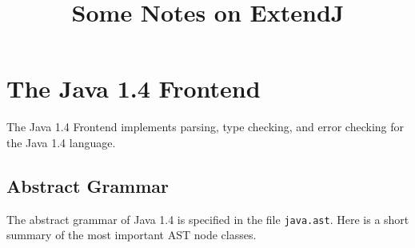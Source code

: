 \documentclass{article}
\title{Some Notes on ExtendJ}
\author{}
\newcommand{\file}[1]{\texttt{#1}}
\begin{document}
\maketitle
\section{The Java 1.4 Frontend}
The Java 1.4 Frontend implements parsing, type checking, and error checking for the Java 1.4 language.

\subsection{Abstract Grammar}
The abstract grammar of Java 1.4 is specified in the file \file{java.ast}. Here is a short summary of the most important AST node classes.
\end{document}
